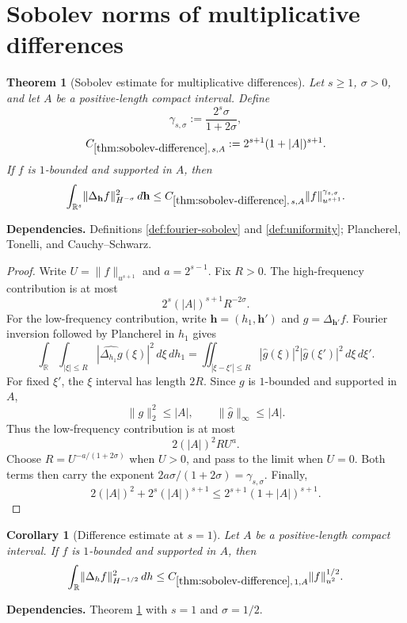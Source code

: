 \documentclass[11pt]{article}
\newtheorem{theorem}{Theorem}[section]
\newtheorem{corollary}[corollary]{Corollary}
\theoremstyle{definition}
\theoremstyle{remark}
\newcommand{\R}{\mathbb R}
\newcommand{\1}{\mathbf 1}
\newcommand{\FT}[1]{\widehat{#1}}
\newcommand{\dd}{\,d}
\newcommand{\uNorm}[2]{\lVert #1\rVert_{u^{#2}}}
\newcommand{\hNorm}[2]{\lVert #1\rVert_{H^{#2}}}
\newcommand{\lpNorm}[2]{\lVert #1\rVert_{#2}}
\newcommand{\uses}[1]{\par\smallskip\noindent\textbf{Dependencies.} #1\par\smallskip}
\begin{document}
\section{Sobolev norms of multiplicative differences}

\begin{theorem}[Sobolev estimate for multiplicative differences]\label{thm:sobolev-difference}
Let $s\geq1$, $\sigma>0$, and let $A$ be a positive-length compact interval.  Define
\[
\gamma_{s,\sigma}:=\frac{2^s\sigma}{1+2\sigma},
\]
\[
C_{\ref{thm:sobolev-difference},\,s,A}
:=
2^{s+1}(1+\lvert A\rvert)^{s+1}.
\]
If $f$ is $1$-bounded and supported in $A$, then
\[
\int_{\R^s}\hNorm{\Delta_{\mathbf h}f}{-\sigma}^2\dd\mathbf h
\leq
C_{\ref{thm:sobolev-difference},\,s,A}
\uNorm f{s+1}^{\gamma_{s,\sigma}}.
\]
\end{theorem}

\uses{Definitions \ref{def:fourier-sobolev} and \ref{def:uniformity}; Plancherel, Tonelli, and Cauchy--Schwarz.}

\begin{proof}
Write $U=\uNorm f{s+1}$ and $a=2^{s-1}$.  Fix $R>0$.  The high-frequency contribution is at most
\[
2^s(\lvert A\rvert)^{s+1}R^{-2\sigma}.
\]
For the low-frequency contribution, write
$\mathbf h=(h_1,\mathbf h')$ and $g=\Delta_{\mathbf h'}f$.  Fourier inversion followed by Plancherel in $h_1$ gives
\[
\int_\R\int_{|\xi|\leq R}|\FT{\Delta_{h_1}g}(\xi)|^2\dd\xi\dd h_1
=
\iint_{|\xi-\xi'|\leq R}|\FT g(\xi)|^2|\FT g(\xi')|^2\dd\xi\dd\xi'.
\]
For fixed $\xi'$, the $\xi$ interval has length $2R$.  Since $g$ is $1$-bounded and supported in $A$,
\[
\lpNorm g2^2\leq\lvert A\rvert,
\qquad
\lpNorm{\FT g}\infty\leq\lvert A\rvert.
\]
Thus the low-frequency contribution is at most
\[
2(\lvert A\rvert)^2RU^a.
\]
Choose
$R=U^{-a/(1+2\sigma)}$ when $U>0$, and pass to the limit when $U=0$.  Both terms then carry the exponent
$2a\sigma/(1+2\sigma)=\gamma_{s,\sigma}$.  Finally,
\[
2(\lvert A\rvert)^2+2^s(\lvert A\rvert)^{s+1}
\leq
2^{s+1}(1+\lvert A\rvert)^{s+1}.
\]
\end{proof}

\begin{corollary}[Difference estimate at $s=1$]\label{cor:sobolev-difference-s1}
Let $A$ be a positive-length compact interval.  If $f$ is $1$-bounded and supported in $A$, then
\[
\int_\R\hNorm{\Delta_hf}{-1/2}^2\dd h
\leq
C_{\ref{thm:sobolev-difference},\,1,A}
\uNorm f2^{1/2}.
\]
\end{corollary}

\uses{Theorem \ref{thm:sobolev-difference} with $s=1$ and $\sigma=1/2$.}
\end{document}
